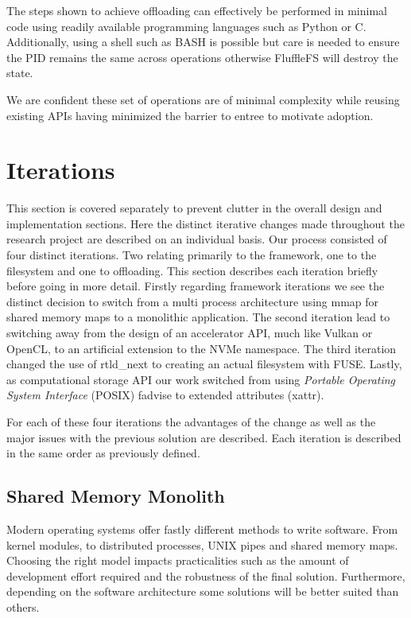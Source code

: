 The steps shown to achieve offloading can effectively be performed in
minimal code using readily available programming languages such as Python or C.
Additionally, using a shell such as BASH is possible but care is needed to
ensure the PID remains the same across operations otherwise FluffleFS will
destroy the state.

We are confident these set of operations are of minimal complexity while reusing
existing APIs having minimized the barrier to entree to motivate adoption.

\section{Iterations}

This section is covered separately to prevent clutter in the overall design and
implementation sections. Here the distinct iterative changes made throughout the
research project are described on an individual basis. Our process consisted of
four distinct iterations. Two relating primarily to the framework, one to the
filesystem and one to offloading. This section describes each iteration briefly
before going in more detail. Firstly regarding framework iterations we see the
distinct decision to switch from a multi process architecture using mmap for
shared memory maps to a monolithic application. The second iteration lead to
switching away from the design of an accelerator API, much like Vulkan
\cite{vulkan} or OpenCL, to an artificial extension to the NVMe namespace.
The third iteration changed the use of rtld\_next \cite{rtldnext} to creating
an actual filesystem with FUSE. Lastly, as computational storage API our work
switched from using \textit{Portable Operating System Interface} (POSIX)
fadvise \cite{fadvise} to extended attributes (xattr).

For each of these four iterations the advantages of the change as well as the
major issues with the previous solution are described. Each iteration is
described in the same order as previously defined.

\subsection{Shared Memory Monolith}

Modern operating systems offer fastly different methods to write software. From
kernel modules, to distributed processes, UNIX pipes and shared memory maps.
Choosing the right model impacts practicalities such as the amount of
development effort required and the robustness of the final solution. 
Furthermore, depending on the software architecture some solutions will be
better suited than others.

